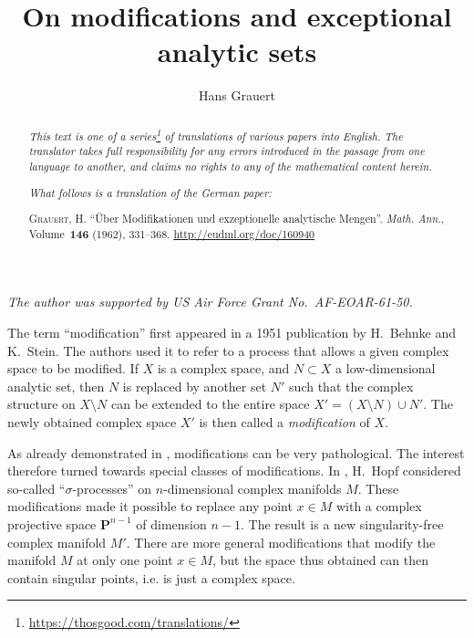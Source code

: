 \documentclass{article}
\title{On modifications and exceptional analytic sets}
\author{Hans Grauert}
\date{}
\theoremstyle{plain}
\theoremstyle{definition}
\newcommand{\PP}{\mathbf{P}}
\newcommand{\oldpage}[1]{\marginpar{\footnotesize$\Big\vert$ \textit{p.~#1}}}
\begin{document}
\maketitle
\thispagestyle{fancy}

\renewcommand{\abstractname}{Translator's note.}

\begin{abstract}
  \renewcommand*{\thefootnote}{\fnsymbol{footnote}}
  \emph{This text is one of a series\footnote{\url{https://thosgood.com/translations/}} of translations of various papers into English.}
  \emph{The translator takes full responsibility for any errors introduced in the passage from one language to another, and claims no rights to any of the mathematical content herein.}

  \medskip

  \emph{What follows is a translation of the German paper:}

  \medskip\noindent
  \textsc{Grauert, H.}
  ``\"{U}ber Modifikationen und exzeptionelle analytische Mengen''.
  \emph{Math. Ann.}, Volume~\textbf{146} (1962), 331--368.
  {\footnotesize\url{http://eudml.org/doc/160940}}
\end{abstract}

\setcounter{footnote}{0}

\setcounter{tocdepth}{1}
\tableofcontents



\section*{}

\emph{The author was supported by US Air Force Grant No.~AF-EOAR-61-50.}

\bigskip

\oldpage{331}
The term ``modification'' first appeared in a 1951 publication \cite{1} by H.~Behnke and K.~Stein.
The authors used it to refer to a process that allows a given complex space to be modified.
If $X$ is a complex space, and $N\subset X$ a low-dimensional analytic set, then $N$ is replaced by another set $N'$ such that the complex structure on $X\setminus N$ can be extended to the entire space $X'=(X\setminus N)\cup N'$.
The newly obtained complex space $X'$ is then called a \emph{modification} of $X$.

As already demonstrated in \cite{1}, modifications can be very pathological.
The interest therefore turned towards special classes of modifications.
In \cite{12}, H.~Hopf considered so-called ``$\sigma$-processes'' on $n$-dimensional complex manifolds $M$.
These modifications made it possible to replace any point $x\in M$ with a complex projective space $\PP^{n-1}$ of dimension $n-1$.
The result is a new singularity-free complex manifold $M'$.
There are more general modifications that modify the manifold $M$ at only one point $x\in M$, but the space thus obtained can then contain singular points, i.e. is just a complex space.
\end{document}
